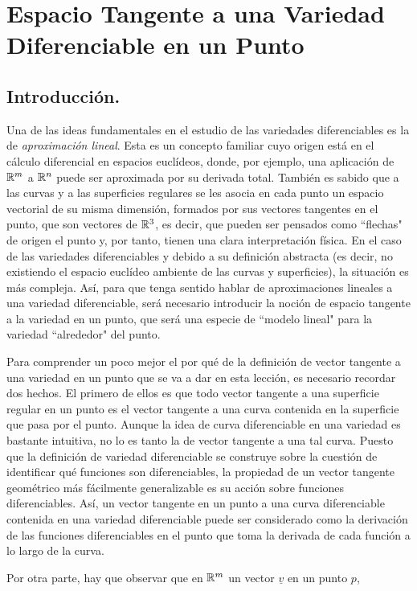 \documentclass[cursovd_portada.tex]{subfiles}
\begin{document}
\chapter{Espacio Tangente a una Variedad Diferenciable en un Punto}
\section{Introducción.}
\hs Una de las ideas fundamentales en el estudio de las variedades
diferenciables es la de {\it aproximación lineal}. Esta es un
concepto familiar cuyo origen está en el cálculo
diferencial en espacios euclídeos, donde, por ejemplo, una
aplicación de $\mathbb{R}^m$ a $\mathbb{R}^n$ puede ser aproximada por su
derivada total. También es sabido que a las curvas y a las
superficies regulares se les asocia en cada punto un espacio
vectorial de su misma dimensión, formados por sus vectores
tangentes en el punto, que son vectores de $\mathbb{R}^3$, es decir, que
pueden ser pensados como ``flechas" de origen el punto y, por
tanto, tienen una clara interpretación física. En el caso
de las variedades diferenciables y debido a su definición
abstracta (es decir, no existiendo el espacio euclídeo
ambiente de las curvas y superficies), la situación es más
compleja. Así, para que tenga sentido hablar de
aproximaciones lineales a una variedad diferenciable, será
necesario introducir la noción de espacio tangente a la
variedad en un punto, que será una especie de ``modelo lineal"
para la variedad ``alrededor" del punto.
\par
Para comprender un poco mejor el por qué de la definición  de vector tangente a una variedad en un punto que se va
a dar en esta lección, es necesario recordar dos hechos. El primero de ellos es que todo vector tangente a una
superficie regular en un punto es el vector tangente a una curva contenida en la superficie que pasa por el punto.
Aunque la idea de curva diferenciable en una variedad es bastante intuitiva, no lo es tanto la de vector tangente
a una tal curva. Puesto que la definición de variedad diferenciable se construye sobre la cuestión  de identificar
qué funciones son diferenciables, la propiedad de un vector tangente geométrico más fácilmente generalizable es su
acción sobre funciones diferenciables. Así, un vector tangente en un punto a una curva diferenciable contenida en
una variedad diferenciable puede ser considerado como la derivación de las funciones diferenciables en el punto
que toma la derivada de cada función a lo largo de la curva.
\par
Por otra parte, hay que observar que en $\mathbb{R}^m$ un vector $\underline{v}$ en un punto $p$,
\end{document}
